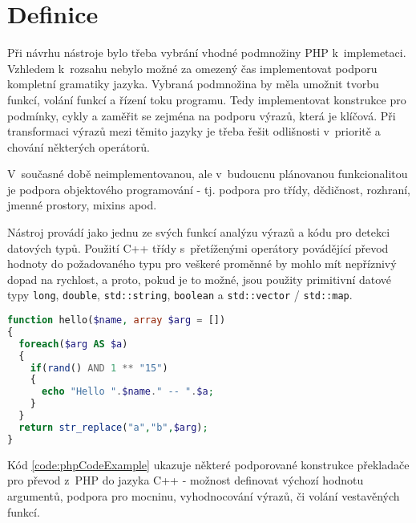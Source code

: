 \documentclass[czech]{ExcelAtFIT}
\newcommand{\function}[1]{\texttt{#1}}
\begin{document}
\section{Definice}

	Při návrhu nástroje bylo třeba vybrání vhodné pod\-mno\-žin\-y PHP k~implemetaci. Vzhledem k~rozsahu nebylo možné za omezený čas implementovat podporu kompletní gramatiky jazyka. Vybraná podmnožina by měla umožnit tvorbu funkcí, volání funkcí a řízení toku programu. Tedy implementovat konstrukce pro podmínky, cykly a zaměřit se zejména na podporu výrazů, která je klíčová. Při transformaci výrazů mezi těmito jazyky je třeba řešit odlišnosti v~prioritě a chování některých operátorů.

	V~současné době neimplementovanou, ale v~budoucnu plánovanou funkcionalitou je podpora objektového programování - tj. podpora pro třídy, dědičnost, rozhraní, jmenné prostory, mixins apod.

	Nástroj provádí jako jednu ze svých funkcí analýzu výrazů a kódu pro detekci datových typů. Použití C++ třídy s~přetíženými operátory povádějící převod hodnoty do požadovaného typu pro veškeré proměnné by mohlo mít nepříznivý dopad na rychlost, a proto, pokud je to možné, jsou použity primitivní datové typy \function{long}, \function{double}, \function{std::string}, \function{boolean} a \function{std::vector} / \function{std::map}.

\begin{lstlisting}[caption=Podporované výrazy PHP, label=code:phpCodeExample, language=PHP]
function hello($name, array $arg = [])
{
  foreach($arg AS $a)
  {
    if(rand() AND 1 ** "15")
    {
      echo "Hello ".$name." -- ".$a;
    }
  }
  return str_replace("a","b",$arg);
}
\end{lstlisting}

	Kód \ref{code:phpCodeExample} ukazuje některé podporované konstrukce překladače pro převod z~PHP do jazyka C++ - možnost definovat výchozí hodnotu argumentů, podpora pro mocninu, vyhodnocování výrazů, či volání ve\-sta\-vě\-ných funkcí.



\end{document}
